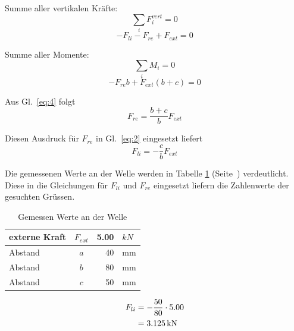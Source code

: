 \documentclass[
a4paper,     %
 headsepline, %
 parskip=half,
 fleqn,       %
12pt         %
]{scrartcl}  %
\begin{document}
Summe aller vertikalen Kräfte:
\begin{equation}
  \label{eq:1}
  \sum\limits_{i} F_{i}^{vert} = 0
\end{equation}
\begin{equation}
  \label{eq:2}
  -F_{li} - F_{re} + F_{ext} = 0
\end{equation}

Summe aller Momente:
\begin{equation}
  \label{eq:3}
  \sum\limits_{i} M_{i} = 0
\end{equation}
\begin{equation}
  \label{eq:4}
  -F_{re}b + F_{ext}(b+c) = 0
\end{equation}

Aus Gl.~\eqref{eq:4} folgt
\begin{equation}
  \label{eq:5}
  F_{re} = \frac{b+c}{b} F_{ext} 
\end{equation}

Diesen Ausdruck für $F_{re}$ in Gl.~\eqref{eq:2} eingesetzt liefert
\begin{equation}
  \label{eq:6}
  F_{li} = -\frac{c}{b} F_{ext} 
\end{equation}

Die gemessenen Werte an der Welle werden in Tabelle \ref{tab:wertewelle} (Seite~\pageref{tab:wertewelle}) verdeutlicht. Diese in die Gleichungen für $F_{li}$ und $F_{re}$ eingesetzt liefern die Zahlenwerte der gesuchten Grüssen.

\begin{table}[bt]
  \centering
  \begin{tabular}{|l|c|r|l|}
\hline
externe Kraft & $F_{ext}$ & 5.00 & $\unit{kN}$ \\
\hline
Abstand       & $a$       & 40    & \unit{mm}   \\
\hline
Abstand       & $b$       & 80    & \unit{mm}   \\
\hline
Abstand       & $c$       & 50    & \unit{mm}   \\
\hline
  \end{tabular}
  \caption{Gemessen Werte an der Welle}
  \label{tab:wertewelle}
\end{table}

\begin{equation}
  \label{eq:9}
  \begin{aligned}
    F_{li} & = -\frac{50}{80}\cdot 5.00 \\
           & = \unit[3.125]{kN}    
  \end{aligned}
\end{equation}
\end{document}

